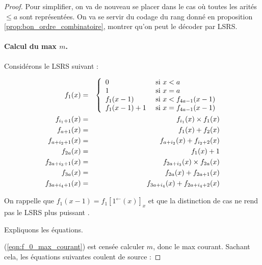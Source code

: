 \documentclass{report}
\newcommand{\eqpred}[3]{#1\left[ #2^{\leftarrow}(#3) \right]_{#3}}
\begin{document}
	\begin{proof}
		Pour simplifier, on va de nouveau se placer dans le cas où toutes les arités $\leqslant a$ sont représentées\footnotemark. On va se servir du codage du rang donné en proposition \ref{prop:bon_ordre_combinatoire}, montrer qu'on peut le décoder par LSRS.
		
			
		\paragraph{Calcul du max $m$.}
			\label{par:calcul_max_bon_ordre}
			Considérons le LSRS suivant :
			
				\begin{eqnarray}
					f_1(x) & = & \left\lbrace \begin{array}{ll} 	
									0 & \text{ si $x < a$} \\
									1 & \text{ si $x = a$} \\
									f_1(x-1) & \text{ si $x < f_{4a-1}(x-1)$} \\
									f_1(x-1)+1 & \text{ si $x = f_{4a-1}(x-1)$}
									 \end{array} \right. 
									\label{eqn:f_0_max_courant}\\
					f_{i_1 + 1}(x) & = & f_{i_1}(x) \times f_1(x) \label{eqn:m_pow_i}\\
					f_{a + 1}(x) & = & f_{1}(x) + f_{2}(x) \label{eqn:sum_m_pow_init}\\
					f_{a + i_2 + 1}(x) & = & f_{a + i_2}(x) + f_{i_2 + 2}(x) \label{eqn:sum_m_pow}\\
					f_{2a}(x) & = & f_1(x) + 1 \label{eqn:m_plus_1}\\
					f_{2a + i_3 + 1}(x) & = & f_{2a + i_3}(x) \times f_{2a}(x) \label{eqn:m1_pow_i}\\
					f_{3a}(x) & = & f_{2a}(x) + f_{2a + 1}(x) \label{eqn:sum_m1_pow_init}\\
					f_{3a + i_4 + 1}(x) & = & f_{3a + i_4}(x) + f_{2a + i_4+2}(x) \label{eqn:sum_m1_pow}
				\end{eqnarray}
		
			On rappelle que $f_1(x-1) = \eqpred{f_1}{1}{x}$ et que la distinction de cas ne rend pas le LSRS plus puissant \cite{GrandjeanSchwentick2002}. 
			
			Expliquons les équations.
			
			(\ref{eqn:f_0_max_courant}) est censée calculer $m$, donc le max courant. Sachant cela, les équations suivantes coulent de source : 
			

\end{proof}
\end{document}
